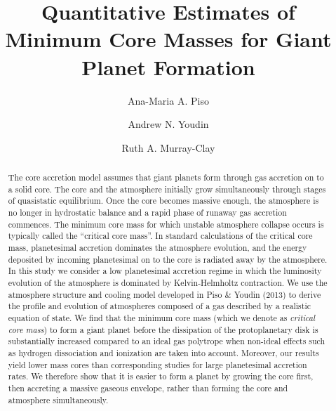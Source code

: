 \documentclass[apj]{emulateapj}
\begin{document}



\title{Quantitative Estimates of Minimum Core Masses for Giant Planet Formation}
\author{Ana-Maria A. Piso}
\author{Andrew N. Youdin}
\author{Ruth A. Murray-Clay}

\begin{abstract}

The core accretion model assumes that giant planets form through gas accretion on to a solid core. The core and the atmosphere initially grow simultaneously through stages of quasistatic equilibrium. Once the core becomes massive enough, the atmosphere is no longer in hydrostatic balance and a rapid phase of runaway gas accretion commences. The minimum core mass for which unstable atmosphere collapse occurs is typically called the ``critical core mass''. In standard calculations of the critical core mass, planetesimal accretion dominates the atmosphere evolution, and the energy deposited by incoming planetesimal on to the core is radiated away by the atmosphere. In this study we consider a low planetesimal accretion regime in which the luminosity evolution of the atmosphere is dominated by Kelvin-Helmholtz contraction. We use the atmosphere structure and cooling model developed in Piso \& Youdin (2013) to derive the profile and evolution of atmospheres composed of a gas described by a realistic equation of state. We find that the minimum core mass (which we denote as \textit{critical core mass}) to form a giant planet before the dissipation of the protoplanetary disk is substantially increased compared to an ideal gas polytrope when non-ideal effects such as hydrogen dissociation and ionization are taken into account. Moreover, our results yield lower mass cores than corresponding studies for large planetesimal accretion rates. We therefore show that it is easier to form a planet by growing the core first, then accreting a massive gaseous envelope, rather than forming the core and atmosphere simultaneously.





\end{abstract}
\end{document}
